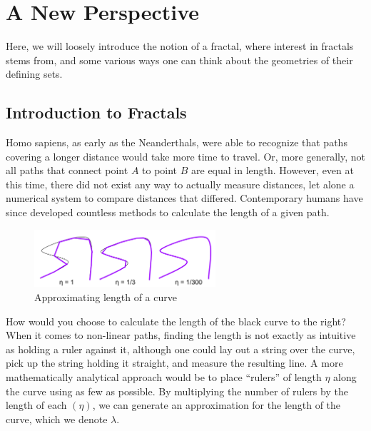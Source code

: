 \chapter{A New Perspective}

\begin{summary}
  Here, we will loosely introduce the notion of a fractal, where interest in fractals stems from, and some various ways one can think about the geometries of their defining sets. 
\end{summary}

\section{Introduction to Fractals}
Homo sapiens, as early as the Neanderthals, were able to recognize that paths covering a longer distance would take more time to travel. Or, more generally, not all paths that connect point $A$ to point $B$ are equal in length. However, even at this time, there did not exist any way to actually measure distances, let alone a numerical system to compare distances that differed. Contemporary humans have since developed countless methods to calculate the length of a given path. \par

\begin{figure}
  \begin{center}
    \includegraphics[width=0.6\textwidth]{Images/1.1.png}
  \end{center}
  \caption{Approximating length of a curve}
\end{figure}

How would you choose to calculate the length of the black curve to the right? When it comes to non-linear paths, finding the length is not exactly as intuitive as holding a ruler against it, although one could lay out a string over the curve, pick up the string holding it straight, and measure the resulting line. A more mathematically analytical approach would be to place ``rulers'' of length $\eta$ along the curve using as few as possible. By multiplying the number of rulers by the length of each $(\eta)$, we can generate an approximation for the length of the curve, which we denote $\lambda$. \par


